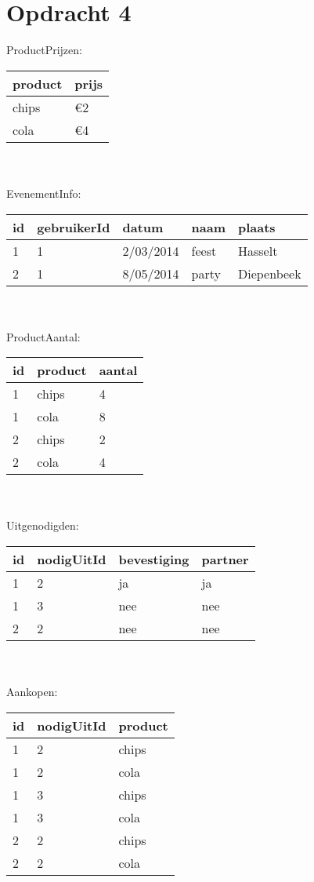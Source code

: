 \documentclass[a4paper]{article}
\begin{document}
\section{Opdracht 4}
ProductPrijzen:\\
\begin{tabular}{| l | l | }
\hline
  product & prijs\\
\hline
  chips & \euro{2} \\
  cola & \euro{4} \\
\hline
\end{tabular}\\\\
EvenementInfo:\\
\begin{tabular}{| l | l | l | l | l |}
\hline
id & gebruikerId & datum & naam & plaats\\
\hline
1 & 1 & 2/03/2014 & feest & Hasselt\\
2 & 1 & 8/05/2014 & party & Diepenbeek\\
\hline
\end{tabular}\\\\
ProductAantal:\\
\begin{tabular}{| l | l | l |}
\hline
id & product & aantal\\
\hline
1 & chips & 4\\
1 & cola & 8\\
2 & chips & 2\\
2 & cola & 4\\
\hline
\end{tabular}\\\\
Uitgenodigden:\\
\begin{tabular}{| l | l | l | l |}
\hline
id & nodigUitId & bevestiging & partner\\
\hline
1 & 2 & ja & ja\\
1 & 3 & nee & nee\\
2 & 2 & nee & nee\\
\hline
\end{tabular}\\\\
Aankopen:\\
\begin{tabular}{| l | l | l |}
\hline
id & nodigUitId & product\\
\hline
1 & 2 & chips\\
1 & 2 & cola\\
1 & 3 & chips\\
1 & 3 & cola\\
2 & 2 & chips\\
2 & 2 & cola\\
\hline
\end{tabular}
\end{document}
